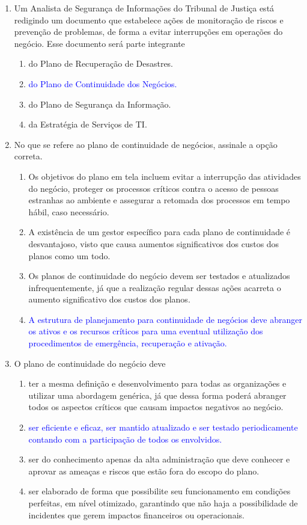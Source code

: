 \documentclass{report}
\begin{document}
\begin{enumerate}
		\item Um Analista de Segurança de Informações do Tribunal de Justiça está redigindo um documento que estabelece ações de monitoração de riscos e prevenção de problemas, de forma a evitar interrupções em operações do negócio. Esse documento será parte integrante
		\begin{enumerate}[label=(\alph*)]
			\item do Plano de Recuperação de Desastres.
			\item \textcolor{blue}{do Plano de Continuidade dos Negócios.}
			\item do Plano de Segurança da Informação.
			\item da Estratégia de Serviços de TI.
		\end{enumerate}
		
		\item No que se refere ao plano de continuidade de negócios, assinale a opção correta.
		\begin{enumerate}[label=(\alph*)]
			\item Os objetivos do plano em tela incluem evitar a interrupção das atividades do negócio, proteger os processos críticos contra o acesso de pessoas estranhas ao ambiente e assegurar a retomada dos processos em tempo hábil, caso necessário.
			\item A existência de um gestor específico para cada plano de continuidade é desvantajoso, visto que causa aumentos significativos dos custos dos planos como um todo.
			\item Os planos de continuidade do negócio devem ser testados e atualizados infrequentemente, já que a realização regular dessas ações acarreta o aumento significativo dos custos dos planos.
			\item \textcolor{blue}{A estrutura de planejamento para continuidade de negócios deve abranger os ativos e os recursos críticos para uma eventual utilização dos procedimentos de emergência, recuperação e ativação.}
		\end{enumerate}
		
		\item O plano de continuidade do negócio deve
		\begin{enumerate}[label=(\alph*)]
			\item ter a mesma definição e desenvolvimento para todas as organizações e utilizar uma abordagem genérica, já que dessa forma poderá abranger todos os aspectos críticos que causam impactos negativos ao negócio.
			\item \textcolor{blue}{ser eficiente e eficaz, ser mantido atualizado e ser testado periodicamente contando com a participação de todos os envolvidos.}
			\item ser do conhecimento apenas da alta administração que deve conhecer e aprovar as ameaças e riscos que estão fora do escopo do plano.
			\item ser elaborado de forma que possibilite seu funcionamento em condições perfeitas, em nível otimizado, garantindo que não haja a possibilidade de incidentes que gerem impactos financeiros ou operacionais.
		\end{enumerate}
		

\end{enumerate}
\end{document}
